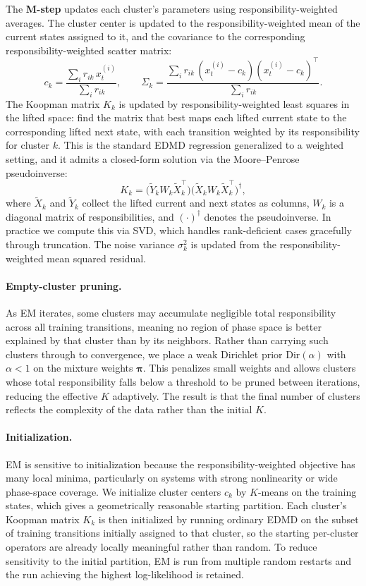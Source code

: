 \documentclass{article}
\begin{document}
The \textbf{M-step} updates each cluster's parameters using responsibility-weighted 
averages. The cluster center is updated to the responsibility-weighted mean of the current 
states assigned to it, and the covariance to the corresponding responsibility-weighted 
scatter matrix:
\[
c_k = \frac{\sum_i r_{ik}\, x_t^{(i)}}{\sum_i r_{ik}}, \qquad
\Sigma_k = \frac{\sum_i r_{ik}\, (x_t^{(i)}-c_k)(x_t^{(i)}-c_k)^\top}{\sum_i r_{ik}}.
\]
The Koopman matrix $K_k$ is updated by responsibility-weighted least squares in the lifted 
space: find the matrix that best maps each lifted current state to the corresponding lifted 
next state, with each transition weighted by its responsibility for cluster $k$. This is the 
standard EDMD regression generalized to a weighted setting, and it admits a closed-form 
solution via the Moore--Penrose pseudoinverse:
\[
K_k = \bigl(\tilde{Y}_k W_k \tilde{X}_k^\top\bigr)
      \bigl(\tilde{X}_k W_k \tilde{X}_k^\top\bigr)^{\dagger},
\]
where $\tilde{X}_k$ and $\tilde{Y}_k$ collect the lifted current and next states as columns, 
$W_k$ is a diagonal matrix of responsibilities, and $(\cdot)^\dagger$ denotes the 
pseudoinverse. In practice we compute this via SVD, which handles rank-deficient cases 
gracefully through truncation. The noise variance $\sigma_k^2$ is updated from the 
responsibility-weighted mean squared residual.


\paragraph{Empty-cluster pruning.} As EM iterates, some clusters may accumulate 
negligible total responsibility across all training transitions, meaning no region of 
phase space is better explained by that cluster than by its neighbors. Rather than 
carrying such clusters through to convergence, we place a weak Dirichlet prior 
$\mathrm{Dir}(\alpha)$ with $\alpha < 1$ on the mixture weights $\boldsymbol{\pi}$. 
This penalizes small weights and allows clusters whose total responsibility falls below 
a threshold to be pruned between iterations, reducing the effective $K$ adaptively. The 
result is that the final number of clusters reflects the complexity of the data rather 
than the initial $K$.

\paragraph{Initialization.} EM is sensitive to initialization because the 
responsibility-weighted objective has many local minima, particularly on systems with 
strong nonlinearity or wide phase-space coverage. We initialize cluster centers $c_k$ 
by $K$-means on the training states, which gives a geometrically reasonable starting 
partition. Each cluster's Koopman matrix $K_k$ is then initialized by running ordinary 
EDMD on the subset of training transitions initially assigned to that cluster, so the 
starting per-cluster operators are already locally meaningful rather than random. To 
reduce sensitivity to the initial partition, EM is run from multiple random restarts 
and the run achieving the highest log-likelihood is retained.
\end{document}
